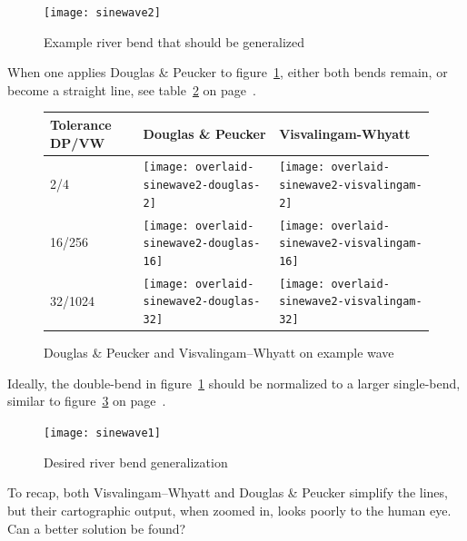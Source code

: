 \documentclass[a4paper]{article}
\newcommand{\DP}{Douglas \& Peucker}
\newcommand{\VW}{Visvalingam--Whyatt}
\begin{document}
\begin{figure}[h]
    \centering
    \texttt{[image: sinewave2]}
    \caption{Example river bend that should be generalized}
    \label{fig:sinewave2}
\end{figure}

When one applies {\DP} to figure~\ref{fig:sinewave2}, either both bends remain,
or become a straight line, see table~\ref{tab:comparison-sinewave2} on
page~\pageref{tab:comparison-sinewave2}.

\begin{figure}[H]
    \renewcommand{\tabularxcolumn}[1]{>{\center\small}m{#1}}
    \begin{tabularx}{\textwidth}{ p{1.5cm} | X | X | }
        Tolerance DP/VW                                                       &
        Douglas \& Peucker                                                    &
        Visvalingam-Whyatt                                                    \tabularnewline \hline

        2/4                                                                   &
        \texttt{[image: overlaid-sinewave2-douglas-2]}      &
        \texttt{[image: overlaid-sinewave2-visvalingam-2]}  \tabularnewline \hline

        16/256                                                                &
        \texttt{[image: overlaid-sinewave2-douglas-16]}     &
        \texttt{[image: overlaid-sinewave2-visvalingam-16]} \tabularnewline \hline

        32/1024                                                               &
        \texttt{[image: overlaid-sinewave2-douglas-32]}     &
        \texttt{[image: overlaid-sinewave2-visvalingam-32]} \tabularnewline \hline

    \end{tabularx}
    \caption{{\DP} and {\VW} on example wave}
    \label{tab:comparison-sinewave2}
\end{figure}

Ideally, the double-bend in figure~\ref{fig:sinewave2} should be normalized to
a larger single-bend, similar to figure~\ref{fig:sinewave1} on
page~\pageref{fig:sinewave2}.

\begin{figure}[h]
    \centering
    \texttt{[image: sinewave1]}
    \caption{Desired river bend generalization}
    \label{fig:sinewave1}
\end{figure}

To recap, both {\VW} and {\DP} simplify the lines, but their cartographic
output, when zoomed in, looks poorly to the human eye. Can a better solution be
found?
\end{document}
